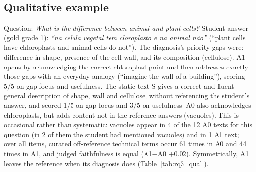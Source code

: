 \documentclass[11pt]{article}
\begin{document}
\begin{table}[h]
\centering\footnotesize
\resizebox{\columnwidth}{!}{}
\caption{Transfer test (exploratory): the simulated student writes notes from the material and answers three new questions without it. $^{*}$: Holm-adjusted $p<0.05$ over 8 contrasts; $n$ varies because of unparseable outputs.}
\label{tab:rb_transfer}
\end{table}

\begin{table}[h]
\centering\footnotesize

\caption{A1$-$S by topic (judge scores, 1--5); two questions on genetics, four on cells and metabolism, nine on body systems.}
\label{tab:rb_topic}
\end{table}

\subsection{Qualitative example}
Question: \emph{What is the difference between animal and plant cells?} Student answer (gold grade 1): \emph{``na celula vegetal tem cloroplasto e na animal n\~ao''} (``plant cells have chloroplasts and animal cells do not''). The diagnosis's priority gaps were: difference in shape, presence of the cell wall, and its composition (cellulose). A1 opens by acknowledging the correct chloroplast point and then addresses exactly those gaps with an everyday analogy (``imagine the wall of a building''), scoring 5/5 on gap focus and usefulness. The static text S gives a correct and fluent general description of shape, wall and cellulose, without referencing the student's answer, and scored 1/5 on gap focus and 3/5 on usefulness. A0 also acknowledges chloroplasts, but adds content not in the reference answers (vacuoles). This is occasional rather than systematic: vacuoles appear in 4 of the 12 A0 texts for this question (in 2 of them the student had mentioned vacuoles) and in 1 A1 text; over all items, curated off-reference technical terms occur 61 times in A0 and 44 times in A1, and judged faithfulness is equal (A1$-$A0 $+0.02$). Symmetrically, A1 leaves the reference when its diagnosis does (Table~\ref{tab:rq3_qual}).
\end{document}
